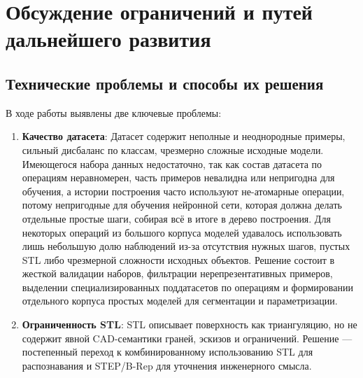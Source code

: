 \section{Обсуждение ограничений и путей дальнейшего развития}

\subsection{Технические проблемы и способы их решения}
В ходе работы выявлены две ключевые проблемы:
\begin{enumerate}
    \item \textbf{Качество датасета}: Датасет содержит неполные и неоднородные примеры, сильный дисбаланс по классам, чрезмерно сложные исходные модели. Имеющегося набора данных недостаточно, так как состав датасета по операциям неравномерен, часть примеров невалидна или непригодна для обучения, а истории построения часто используют не-атомарные операции, потому непригодные для обучения нейронной сети, которая должна делать отдельные простые шаги, собирая всё в итоге в дерево построения. Для некоторых операций из большого корпуса моделей удавалось использовать лишь небольшую долю наблюдений из-за отсутствия нужных шагов, пустых STL либо чрезмерной сложности исходных объектов. Решение состоит в жесткой валидации наборов, фильтрации нерепрезентативных примеров, выделении специализированных поддатасетов по операциям и формировании отдельного корпуса простых моделей для сегментации и параметризации.
    \item \textbf{Ограниченность STL}: STL описывает поверхность как триангуляцию, но не содержит явной CAD-семантики граней, эскизов и ограничений. Решение — постепенный переход к комбинированному использованию STL для распознавания и STEP/B-Rep для уточнения инженерного смысла.
\end{enumerate}

